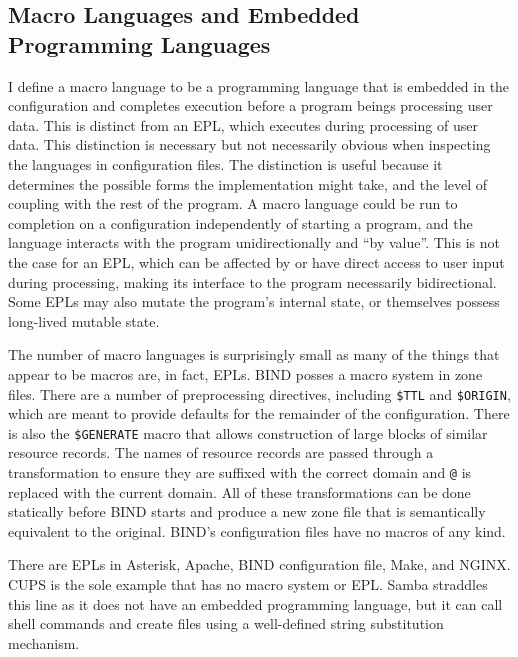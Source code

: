 \documentclass[letterpaper,twocolumn,10pt]{article}
\begin{document}
\subsection{Macro Languages and Embedded Programming Languages}
I define a macro language to be a programming language that is embedded in the configuration and completes execution before a program beings processing user data. This is distinct from an EPL, which executes during processing of user data. This distinction is necessary but not necessarily obvious when inspecting the languages in configuration files. The distinction is useful because it determines the possible forms the implementation might take, and the level of coupling with the rest of the program. A macro language could be run to completion on a configuration independently of starting a program, and the language interacts with the program unidirectionally and ``by value''. This is not the case for an EPL, which can be affected by or have direct access to user input during processing, making its interface to the program necessarily bidirectional. Some EPLs may also mutate the program's internal state, or themselves possess long-lived mutable state.

The number of macro languages is surprisingly small as many of the things that appear to be macros are, in fact, EPLs. BIND posses a macro system in zone files. There are a number of preprocessing directives, including \texttt{\$TTL} and \texttt{\$ORIGIN}, which are meant to provide defaults for the remainder of the configuration. There is also the \texttt{\$GENERATE} macro that allows construction of large blocks of similar resource records. The names of resource records are passed through a transformation to ensure they are suffixed with the correct domain and \texttt{@} is replaced with the current domain. All of these transformations can be done statically before BIND starts and produce a new zone file that is semantically equivalent to the original. BIND's configuration files have no macros of any kind.

There are EPLs in Asterisk, Apache, BIND configuration file, Make, and NGINX. CUPS is the sole example that has no macro system or EPL. Samba straddles this line as it does not have an embedded programming language, but it can call shell commands and create files using a well-defined string substitution mechanism.
\end{document}
